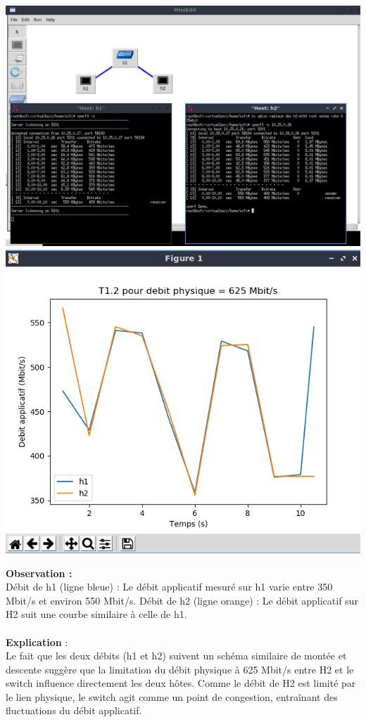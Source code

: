 \begin{center}
    \includegraphics[width=1\textwidth]{./images/T1.2/625test2.png}
    \includegraphics[width=1\textwidth]{./images/T1.2/courbe625test2.png}
\end{center}
\textbf{Observation :}\\
Débit de h1 (ligne bleue) : Le débit applicatif mesuré sur h1 varie entre 350 Mbit/s et environ 550 Mbit/s.
Débit de h2 (ligne orange) : Le débit applicatif sur H2 suit une courbe similaire à celle de h1.
\\
\\
\textbf{Explication} :\\
Le fait que les deux débits (h1 et h2) suivent un schéma similaire de montée et descente suggère que la limitation du débit physique à 625 Mbit/s entre H2 et le switch influence directement les deux hôtes. Comme le débit de H2 est limité par le lien physique, le switch agit comme un point de congestion, entraînant des fluctuations du débit applicatif.
